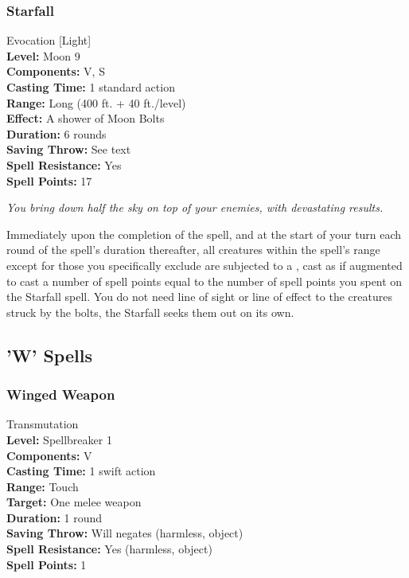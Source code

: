 \subsubsection{Starfall}
\label{Spell:Starfall}
Evocation [Light]
\\ \textbf{Level:} Moon 9
\\ \textbf{Components:} V, S
\\ \textbf{Casting Time:} 1 standard action
\\ \textbf{Range:} Long (400 ft. + 40 ft./level)
\\ \textbf{Effect:} A shower of Moon Bolts
\\ \textbf{Duration:} 6 rounds
\\ \textbf{Saving Throw:} See text
\\ \textbf{Spell Resistance:} Yes
\\ \textbf{Spell Points:} 17

\emph{You bring down half the sky on top of your enemies, with devastating results.}

Immediately upon the completion of the spell, and at the start of your turn each round of the spell's duration thereafter, all creatures within the spell's range except for those you specifically exclude are subjected to a , cast as if augmented to cast a number of spell points equal to the number of spell points you spent on the Starfall spell. You do not need line of sight or line of effect to the creatures struck by the bolts, the Starfall seeks them out on its own.
\subsection{'W' Spells}
\subsubsection{Winged Weapon}
\label{Spell:WingedWeapon}
Transmutation
\\ \textbf{Level:} Spellbreaker 1
\\ \textbf{Components:} V
\\ \textbf{Casting Time:} 1 swift action
\\ \textbf{Range:} Touch
\\ \textbf{Target:} One melee weapon
\\ \textbf{Duration:} 1 round
\\ \textbf{Saving Throw:} Will negates (harmless, object)
\\ \textbf{Spell Resistance:} Yes (harmless, object)
\\ \textbf{Spell Points:} 1

